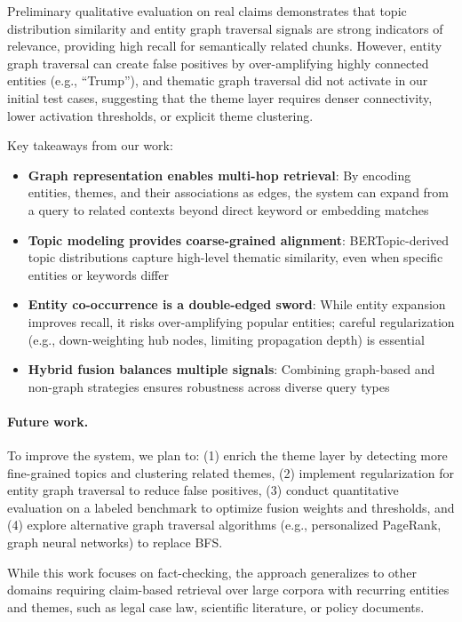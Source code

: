 \documentclass[10pt]{article}
\begin{document}
Preliminary qualitative evaluation on real claims demonstrates that topic distribution similarity and entity graph traversal signals are strong indicators of relevance, providing high recall for semantically related chunks. However, entity graph traversal can create false positives by over-amplifying highly connected entities (e.g., ``Trump''), and thematic graph traversal did not activate in our initial test cases, suggesting that the theme layer requires denser connectivity, lower activation thresholds, or explicit theme clustering.

Key takeaways from our work:

\begin{itemize}[itemsep=2pt]
    \item \textbf{Graph representation enables multi-hop retrieval}: By encoding entities, themes, and their associations as edges, the system can expand from a query to related contexts beyond direct keyword or embedding matches
    \item \textbf{Topic modeling provides coarse-grained alignment}: BERTopic-derived topic distributions capture high-level thematic similarity, even when specific entities or keywords differ
    \item \textbf{Entity co-occurrence is a double-edged sword}: While entity expansion improves recall, it risks over-amplifying popular entities; careful regularization (e.g., down-weighting hub nodes, limiting propagation depth) is essential
    \item \textbf{Hybrid fusion balances multiple signals}: Combining graph-based and non-graph strategies ensures robustness across diverse query types
\end{itemize}

\paragraph{Future work.} To improve the system, we plan to: (1) enrich the theme layer by detecting more fine-grained topics and clustering related themes, (2) implement regularization for entity graph traversal to reduce false positives, (3) conduct quantitative evaluation on a labeled benchmark to optimize fusion weights and thresholds, and (4) explore alternative graph traversal algorithms (e.g., personalized PageRank, graph neural networks) to replace BFS.

While this work focuses on fact-checking, the approach generalizes to other domains requiring claim-based retrieval over large corpora with recurring entities and themes, such as legal case law, scientific literature, or policy documents.
\end{document}
